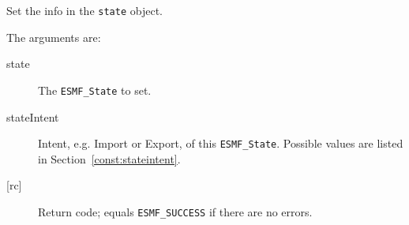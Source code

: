         Set the info in the {\tt state} object.
  
       The arguments are:
        \begin{description}     
        \item[state]
          The {\tt ESMF\_State} to set.
        \item[stateIntent]
          Intent, e.g. Import or Export, of this {\tt ESMF\_State}.
          Possible values are listed in Section~\ref{const:stateintent}.
        \item[{[rc]}]
          Return code; equals {\tt ESMF\_SUCCESS} if there are no errors.
        \end{description}
  
\setlength{\parskip}{\oldparskip}
\setlength{\parindent}{\oldparindent}
\setlength{\baselineskip}{\oldbaselineskip}
